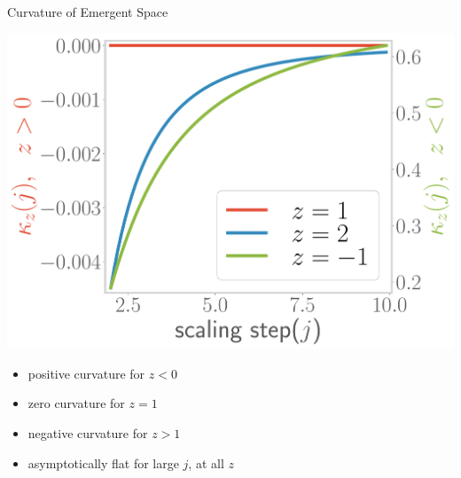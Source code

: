 \documentclass[12pt,aspectratio=169]{beamer}
\begin{document}
\begin{frame}{Curvature of Emergent Space}
\begin{minipage}{0.45\textwidth}
	\includegraphics[width=\textwidth]{figures/curvature-pos.pdf}
\end{minipage}
\begin{minipage}{0.5\textwidth}
	\begin{itemize}
		\item positive curvature for \(z < 0\)\\[10pt]
		\item zero curvature for \(z = 1\)\\[10pt]
		\item negative curvature for \(z  > 1\)\\[10pt]
		\item \alert{asymptotically flat} for large \(j\), at all \(z\)
	\end{itemize}
\end{minipage}

\end{frame}
\end{document}
